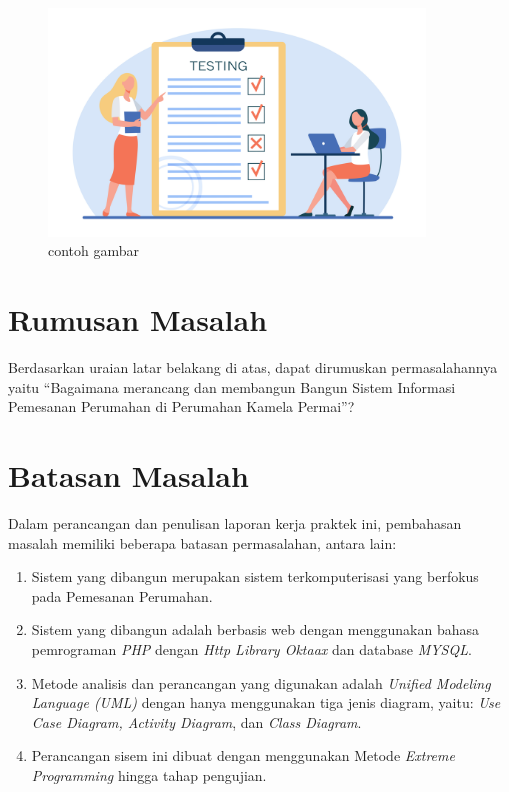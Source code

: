 \documentclass[12pt, a4paper, onecolumn, oneside, final]{report}
\begin{document}
        \begin{figure}
        \centering
        \includegraphics[width=10cm]{test.jpg}
        \caption{contoh gambar}
        \end{figure}
        \section{Rumusan Masalah}
\par  Berdasarkan uraian latar belakang di atas, dapat dirumuskan permasalahannya yaitu “Bagaimana merancang dan membangun Bangun Sistem Informasi Pemesanan Perumahan di Perumahan Kamela Permai”?
\section{Batasan Masalah}
\par  Dalam perancangan dan penulisan laporan kerja praktek ini, pembahasan masalah memiliki beberapa batasan permasalahan, antara lain:
\begin{enumerate}
\item \par Sistem yang dibangun merupakan sistem terkomputerisasi yang berfokus pada Pemesanan Perumahan.

\item \par Sistem yang dibangun adalah berbasis web dengan menggunakan bahasa pemrograman \textit{PHP} dengan \textit{Http Library Oktaax} dan database \textit{MYSQL}.

\item \par Metode analisis dan perancangan yang digunakan adalah \textit{Unified Modeling Language (UML)} dengan hanya menggunakan tiga jenis diagram, yaitu: \textit{Use Case Diagram, Activity Diagram}, dan \textit{Class Diagram}.

\item \par Perancangan sisem ini dibuat dengan menggunakan Metode \textit{Extreme Programming} hingga tahap pengujian.

\end{enumerate}
\end{document}
